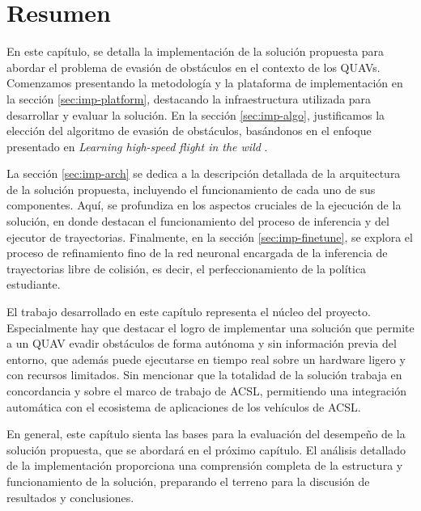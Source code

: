 \section{Resumen}

En este capítulo, se detalla la implementación de la solución propuesta para abordar el problema de evasión de obstáculos en el contexto de los QUAVs. Comenzamos presentando la metodología y la plataforma de implementación en la sección \ref{sec:imp-platform}, destacando la infraestructura utilizada para desarrollar y evaluar la solución. En la sección \ref{sec:imp-algo}, justificamos la elección del algoritmo de evasión de obstáculos, basándonos en el enfoque presentado en \textit{Learning high-speed flight in the wild} \cite{Loquercio2021}.

La sección \ref{sec:imp-arch} se dedica a la descripción detallada de la arquitectura de la solución propuesta, incluyendo el funcionamiento de cada uno de sus componentes. Aquí, se profundiza en los aspectos cruciales de la ejecución de la solución, en donde destacan el funcionamiento del proceso de inferencia y del ejecutor de trayectorias. Finalmente, en la sección \ref{sec:imp-finetune}, se explora el proceso de refinamiento fino de la red neuronal encargada de la inferencia de trayectorias libre de colisión, es decir, el perfeccionamiento de la política estudiante.

El trabajo desarrollado en este capítulo representa el núcleo del proyecto. Especialmente hay que destacar el logro de implementar una solución que permite a un QUAV evadir obstáculos de forma autónoma y sin información previa del entorno, que además puede ejecutarse en tiempo real sobre un hardware ligero y con recursos limitados. Sin mencionar que la totalidad de la solución trabaja en concordancia y sobre el marco de trabajo de ACSL, permitiendo una integración automática con el ecosistema de aplicaciones de los vehículos de ACSL.

En general, este capítulo sienta las bases para la evaluación del desempeño de la solución propuesta, que se abordará en el próximo capítulo. El análisis detallado de la implementación proporciona una comprensión completa de la estructura y funcionamiento de la solución, preparando el terreno para la discusión de resultados y conclusiones.